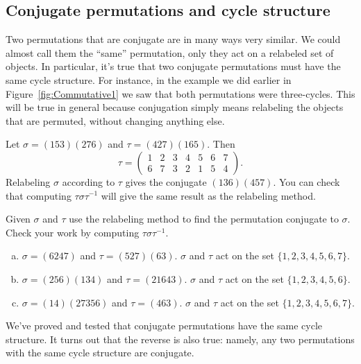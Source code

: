 \subsection *{Conjugate permutations and cycle structure}

Two permutations that are conjugate are in many ways very similar. We could almost call them the ``same'' permutation, only they act on a relabeled set of objects. In particular, it's true that two conjugate permutations must have the same cycle structure. For instance, in the example we did earlier in Figure~\ref{fig:Commutative1} we saw that both permutations were three-cycles.  This will be true in general because conjugation simply means relabeling the objects that are permuted, without changing anything else.

\begin{example}\label{example:actions:Conj2}
Let $\sigma = (153)(276)$ and $\tau = (427)(165)$. Then
$$\tau=\begin{pmatrix} 1&2&3&4&5&6&7\\6&7&3&2&1&5&4  \end{pmatrix}.$$ 
Relabeling $\sigma$ according to $\tau$ gives the conjugate $(136)(457)$. You can check that computing $ \tau \sigma \tau^{-1}$ will give the same result as the relabeling method.
\end{example}
\begin{exercise}\label{exercise:actions:Conj3}
Given $\sigma$ and $\tau$ use the relabeling method to find the permutation conjugate to $\sigma$.  Check your work by computing $\tau\sigma\tau^{-1}$.
\begin{enumerate}[(a)]
\item 
$\sigma=(6247)$ and $\tau=(527)(63)$.  $\sigma$ and $\tau$ act on the set $\{1,2,3,4,5,6,7\}$.
\item
$\sigma=(256)(134)$ and $\tau=(21643)$.  $\sigma$ and $\tau$ act on the set $\{1,2,3,4,5,6\}$.
\item
$\sigma=(14)(27356)$ and $\tau=(463)$.  $\sigma$ and $\tau$ act on the set $\{1,2,3,4,5,6,7\}$.
\end{enumerate}
\end{exercise}

We've proved and tested that conjugate permutations have the same cycle structure. It turns out that the reverse is also true: namely, any two permutations with the same cycle structure are conjugate.

